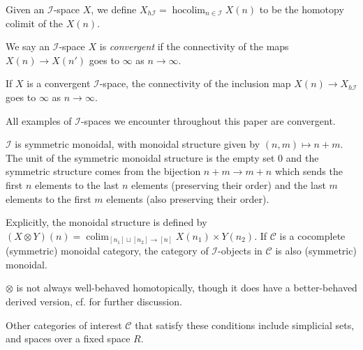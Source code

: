 \documentclass{TPmod}
\newcommand{\cC}{\mathcal{C}}
\newcommand{\cI}{\mathcal{I}}
\numberwithin{equation}{section}
\begin{document}
    Given an $\cI$-space $X$, we define $X_{h\cI}=\operatorname{hocolim}_{n \in \cI} X(n)$ to be the homotopy colimit of the $X(n)$.
    

    
    We say an $\cI$-space $X$ is \emph{convergent} if the connectivity of the maps $X(n) \to X(n')$ goes to $\infty$ as $n \to \infty$.
    \begin{lem}
        If $X$ is a convergent $\cI$-space, the connectivity of the inclusion map $X(n) \to X_{h\cI}$ goes to $\infty$ as $n \to \infty$.
    \end{lem}
    \begin{rmk}
        All examples of $\cI$-spaces we encounter throughout this paper are convergent. 
    \end{rmk}
    
    $\cI$ is symmetric monoidal, with monoidal structure given by $(n, m) \mapsto n+m$. The unit of the symmetric monoidal structure is the empty set $0$ and the symmetric structure comes from the bijection $n+m \to m+n$ which sends the first $n$ elements to the last $n$ elements (preserving their order) and the last $m$ elements to the first $m$ elements (also preserving their order).

    \begin{rmk}
        Explicitly, the monoidal structure is defined by $(X \otimes Y)(n) = \operatorname{colim}_{[n_1] \sqcup [n_2] \to [n]} X(n_1) \times Y(n_2)$. If $\cC$ is a cocomplete (symmetric) monoidal category, the category of $\cI$-objects in $\cC$ is also (symmetric) monoidal.

        $\otimes$ is not always well-behaved homotopically, though it does have a better-behaved derived version, cf. \cite[Section 2]{Sagave-Schlichtkrull:Gp} for further discussion.
    \end{rmk}
    \begin{ex}
        Other categories of interest $\cC$ that satisfy these conditions include simplicial sets, and spaces over a fixed space $R$.
    \end{ex}
\end{document}
